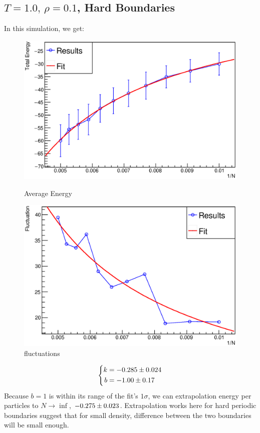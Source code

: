 \documentclass[UTF8,a4paper]{article}
\begin{document}
\subsection{$T =1.0,\, \rho = 0.1$, Hard Boundaries}
In this simulation, we get:
\begin{figure}[H]
	\centering
	\begin{minipage}[t]{0.45\textwidth}
		\centering
		\includegraphics[height=0.2\textheight]{Root Fit/fit_exp2_h.eps}
		\caption{Average Energy}
	\end{minipage}\hspace{0.5cm}
	\begin{minipage}[t]{0.45\textwidth}
		\centering
		\includegraphics[height=0.2\textheight]{Root Fit/fit_exp2_f_h.eps}
		\caption{fluctuations}
	\end{minipage}
\end{figure}

\begin{equation}
	\left\{
		\begin{aligned}
			k &= \num[separate-uncertainty = true]{-0.285+-0.024}\\
			b &= \num[separate-uncertainty = true]{-1.00+-0.17}
		\end{aligned}
	\right.
\end{equation}
Because $b=1$ is within its range of the fit's $1\sigma$, we can extrapolation energy per particles to $N\to \inf$, $\num[separate-uncertainty = true]{-0.275+-0.023}$. 
Extrapolation works here for hard periodic boundaries suggest that for small density, difference between the two boundaries will be small enough.
\end{document}
